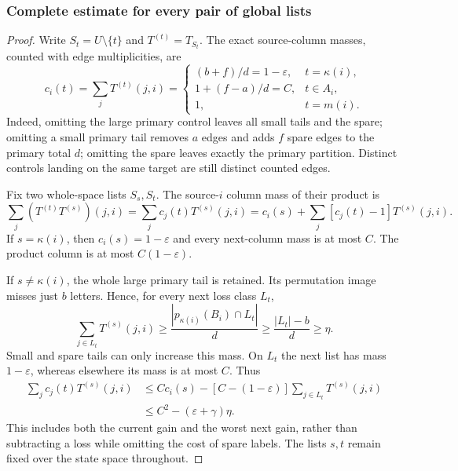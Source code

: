 \documentclass[11pt,reqno]{amsart}
\numberwithin{equation}{section}
\theoremstyle{definition}
\newcommand{\eps}{\varepsilon}
\begin{document}
\subsubsection{Complete estimate for every pair of global lists}
\begin{proof}
Write $S_t=U\setminus\{t\}$ and $T^{(t)}=T_{S_t}$.
The exact source-column masses, counted with edge multiplicities,
are
\begin{equation}\label{eq:gain-columns}
 c_i(t)=\sum_jT^{(t)}(j,i)=
 \begin{cases}
 (b+f)/d=1-\eps,&t=\kappa(i),\\
 1+(f-a)/d=C,&t\in A_i,\\
 1,&t=m(i).
 \end{cases}
\end{equation}
Indeed, omitting the large primary control leaves all small tails
and the spare; omitting a small primary tail removes $a$ edges
and adds $f$ spare edges to the primary total $d$; omitting the
spare leaves exactly the primary partition. Distinct controls landing
on the same target are still distinct counted edges.

Fix two whole-space lists $S_s,S_t$. The source-$i$ column mass
of their product is
\begin{equation}\label{eq:gain-identity}
 \sum_j(T^{(t)}T^{(s)})(j,i)
 =\sum_jc_j(t)T^{(s)}(j,i)
 =c_i(s)+\sum_j[c_j(t)-1]T^{(s)}(j,i).
\end{equation}
If $s=\kappa(i)$, then $c_i(s)=1-\eps$ and every next-column
mass is at most $C$. The product column is at most $C(1-\eps)$.

If $s\ne\kappa(i)$, the whole large primary tail is retained.
Its permutation image misses just $b$ letters. Hence, for every
next loss class $L_t$,
\begin{equation}\label{eq:gain-landing}
 \sum_{j\in L_t}T^{(s)}(j,i)
 \ge\frac{|p_{\kappa(i)}(B_i)\cap L_t|}{d}
 \ge\frac{|L_t|-b}{d}\ge\eta.
\end{equation}
Small and spare tails can only increase this mass. On $L_t$ the
next list has mass $1-\eps$, whereas elsewhere its mass is at
most $C$. Thus
\begin{align}
 \sum_jc_j(t)T^{(s)}(j,i)
 &\le Cc_i(s)-[C-(1-\eps)]
             \sum_{j\in L_t}T^{(s)}(j,i)\nonumber\\
 &\le C^2-(\eps+\gamma)\eta.
 \label{eq:gain-pair}
\end{align}
This includes both the current gain and the worst next gain, rather
than subtracting a loss while omitting the cost of spare labels.
The lists $s,t$ remain fixed over the state space throughout.


\end{proof}
\end{document}
